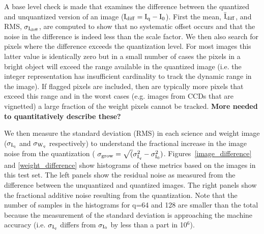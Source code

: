 A base level check is made that examines the difference between the quantized and unquantized version
of an image (${\rm I}_{\rm diff} = {\rm I}_{\rm q}-{\rm I}_{\rm 0}$).  First the mean, 
$\bar{\rm I}_{\rm diff}$, and RMS, $\sigma_{{\rm I}_{\rm diff}}$, are computed to show that no
systematic offset occurs and that the noise in the difference is indeed less than the scale factor.
We then also search for pixels where the difference exceeds the quantization level.  For most images
this latter value is identically zero but in a small number of cases the pixels in a bright object
will exceed the range available in the quantized image (i.e. the integer representation has insufficient
cardinality to track the dynamic range in the image).  If flagged pixels are included, then are typically
more pixels that exceed this range and in the worst cases (e.g. images from CCDs that are vignetted) a
large fraction of the weight pixels cannot be tracked.
{\bf More needed to quantitatively describe these?}

We then measure the standard deviation (RMS) in each science and weight image ($\sigma_{{\rm I}_{\rm q}}$ 
and $\sigma_{{\rm W}_{q}}$ respectively) to understand the fractional increase in the image noise
from the quantization ( $\sigma_{\rm grow} = \sqrt(\sigma_{{\rm I}_{q}}^2 - \sigma_{{\rm I}_{0}}^2 )$.  
Figures~\ref{image_difference} and \ref{weight_difference} show histograms of these metrics based
on the images in this test set.  The left panels show the residual noise as measured from the difference
between the unquantized and quantized images.  The right panels show the fractional additive noise 
resulting from the quantization.  Note that the number of samples in the histograms for q=64 and 128 
are smaller than the total because the measurement of the standard deviation is approaching the machine 
accuracy (i.e.  $\sigma_{{\rm I}_{q}}$ differs from $\sigma_{{\rm I}_{0}}$ by less than a part in 10$^{6}$).


